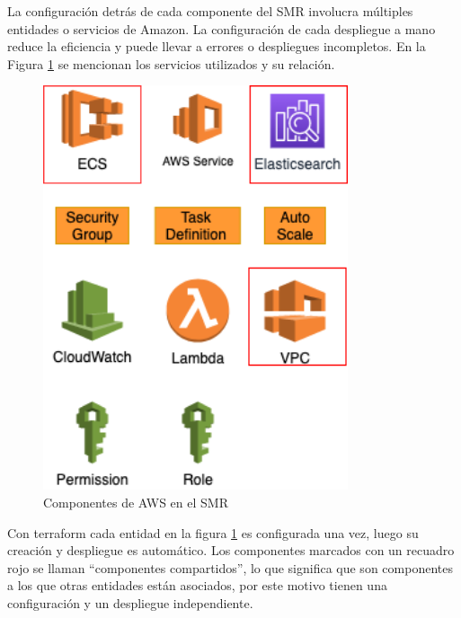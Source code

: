 La configuración detrás de cada componente del SMR involucra múltiples entidades o servicios de Amazon. La configuración de cada despliegue a mano reduce la eficiencia y puede llevar a errores o despliegues incompletos. En la Figura \ref{archcomponents} se mencionan los servicios utilizados y su relación.

\begin{figure}[H]
	\centering
	\includegraphics[width=0.80\textwidth]{bibliografia/Imagenes/Architecture Components.png}
	\caption{Componentes de AWS en el SMR}
	\label{archcomponents}
\end{figure}

Con terraform cada entidad en la figura \ref{archcomponents} es configurada una vez, luego su creación y despliegue es automático. Los componentes marcados con un recuadro rojo se llaman ``componentes compartidos'', lo que significa que son componentes a los que otras entidades están asociados, por este motivo tienen una configuración y un despliegue independiente.

